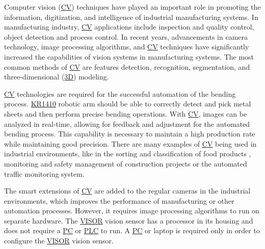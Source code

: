 
Computer vision (\hyperref[acro:CV]{CV}) techniques have played an important role in promoting the information, digitization, and intelligence of industrial manufacturing systems.
In manufacturing industry, \hyperref[acro:CV]{CV} applications include inspection and quality control, object detection and process control.
In recent years, advancements in camera technology, image processing algorithms, and \hyperref[acro:CV]{CV} techniques have significantly increased the capabilities of vision systems in manufacturing systems.
The most common methods of \hyperref[acro:CV]{CV} are features detection, recognition, segmentation, and three-dimensional (\hyperref[acro:3D]{3D}) modeling. \cite{9761203}

\hyperref[acro:CV]{CV} technologies are required for the successful automation of the bending process. \hyperref[acro:KR]{KR1410} robotic arm should be able to correctly detect and pick metal sheets and then perform precise bending operations. With \hyperref[acro:CV]{CV}, images can be analyzed in real-time, allowing for feedback and adjustment for the automated bending process.
This capability is necessary to maintain a high production rate while maintaining good precision.
There are many examples of \hyperref[acro:CV]{CV} being used in industrial environments, like in the sorting and classification of food products \cite{BARNES2010339, THROOP2005281,BURGOSARTIZZU2010138}, monitoring and safety management of construction projects \cite{PANERU2021103940} or the automated traffic monitoring system. \cite{7892717,COIFMAN1998271}

The smart extensions of \hyperref[acro:CV]{CV} are added to the regular cameras in the industrial environments, which improves the performance of manufacturing or other automation processes. \cite{BREZANI2022298} However, it requires image processing algorithms to run on separate hardware. 
The \hyperref[acro:VISOR]{VISOR}\textsuperscript{\textregistered} vision sensor has a processor in its housing and does not require a \hyperref[acro:PC]{PC} or \hyperref[acro:PLC]{PLC} to run. A \hyperref[acro:PC]{PC} or laptop is required only in order to configure the
\hyperref[acro:VISOR]{VISOR}\textsuperscript{\textregistered} vision sensor. \cite[page 23]{visor_user_manual}